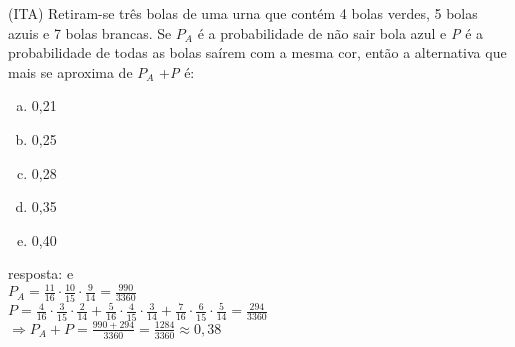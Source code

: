 \begin{ex}
 (ITA) Retiram-se três bolas de uma urna que contém 4 bolas verdes, 5 bolas azuis e 7 bolas brancas. Se $ P_A $ é a probabilidade de não sair bola azul e \textit{P} é a probabilidade de todas as bolas saírem com a mesma cor, então a alternativa que mais se aproxima de $P_A$ +\textit{P} é:
    \begin{enumerate}[(a)]
    \item 0,21
    \item 0,25
    \item 0,28
    \item 0,35
    \item 0,40
    \end{enumerate}
      \begin{sol}
       resposta: e \\
       $P_A=\frac{11}{16}\cdot\frac{10}{15}\cdot\frac{9}{14}=\frac{990}{3360}$\\
       $P=\frac{4}{16}\cdot\frac{3}{15}\cdot\frac{2}{14}+\frac{5}{16}\cdot\frac{4}{15}\cdot\frac{3}{14}+\frac{7}{16}\cdot\frac{6}{15}\cdot\frac{5}{14}=\frac{294}{3360}$ \\
       $\Longrightarrow P_A+P=\frac{990+294}{3360}=\frac{1284}{3360}\approx0,38$
      \end{sol}
\end{ex}